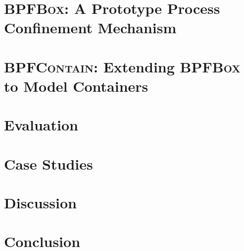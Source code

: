 \documentclass[
  fontsize=12pt,
  titlepage=firstiscover,
  paper=letter,
  oneside,
  cleardoublepage=plain,
  parskip=half-,
  DIV=10,
  parindent,
  appendixprefix,
  chapterprefix,
  listof=totoc,
]{scrbook}
\newcommand{\bpfbox}{\textsc{BPFBox}}
\newcommand{\bpfcontain}{\textsc{BPFContain}}
\begin{document}
\chapter{\bpfbox: A Prototype Process Confinement Mechanism}%
\label{c:bpfbox}


\chapter{\bpfcontain: Extending \bpfbox{} to Model Containers}%
\label{c:bpfcontain}


\chapter{Evaluation}%
\label{c:evaluation}


\chapter{Case Studies}%
\label{c:case-studies}


\chapter{Discussion}%
\label{c:discussion}


\chapter{Conclusion}%
\label{c:conclusion}


\cleardoublepage%
\printbibliography%
%
\nocite{*} %

\appendix%
\printglossary[type=\acronymtype, title=List of Acronyms, toctitle=List of Acronyms]
\end{document}
